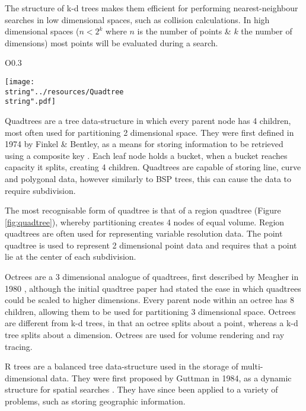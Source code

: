       The structure of k-d trees makes them efficient for performing nearest-neighbour searches in low dimensional spaces, such as collision calculations. In high dimensional spaces ($n < 2^{k}$ where $n$ is the number of points \& $k$ the number of dimensions) most points will be evaluated during a search.
\begin{wrapfigure}{O}{0.3\columnwidth}
  \begin{centering}
    \texttt{[image: \\string"../resources/Quadtree\\string".pdf]}
  \par\end{centering}
  \protect\caption[A visual representation of region quadtree.]{\label{fig:quadtree}A visual representation of region quadtree. The black outline shows the root node, whose child nodes have a red outline, this continues through orange, green and blue.}
\end{wrapfigure}

      Quadtrees are a tree data-structure in which every parent node has 4 children, most often used for partitioning 2 dimensional space. They were first defined in 1974 by Finkel \& Bentley, as a means for storing information to be retrieved using a composite key \cite{FB74}. Each leaf node holds a bucket, when a bucket reaches capacity it splits, creating 4 children. Quadtrees are capable of storing line, curve and polygonal data, however similarly to BSP trees, this can cause the data to require subdivision.
      
      The most recognisable form of quadtree is that of a region quadtree (Figure \ref{fig:quadtree}), whereby partitioning creates 4 nodes of equal volume. Region quadtrees are often used for representing variable resolution data. The point quadtree is used to represent 2 dimensional point data and requires that a point lie at the center of each subdivision.
      
      Octrees are a 3 dimensional analogue of quadtrees, first described by Meagher in 1980 \cite{Mea80}, although the initial quadtree paper \cite{FB74} had stated the ease in which quadtrees could be scaled to higher dimensions. Every parent node within an octree has 8 children, allowing them to be used for partitioning 3 dimensional space. Octrees are different from k-d trees, in that an octree splits about a point, whereas a k-d tree splits about a dimension. Octrees are used for volume rendering and ray tracing.
      
      R trees are a balanced tree data-structure used in the storage of multi-dimensional data. They were first proposed by Guttman in 1984, as a dynamic structure for spatial searches \cite{Gut84}. They have since been applied to a variety of problems, such as storing geographic information. 

